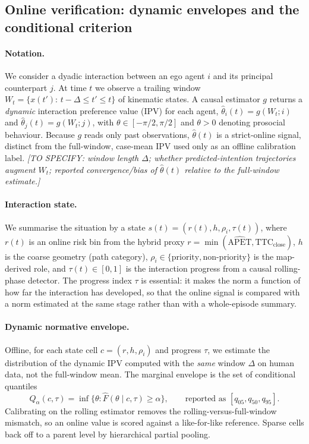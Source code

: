 \documentclass[12pt,a4paper]{article}
\begin{document}
\subsection{Online verification: dynamic envelopes and the conditional criterion}

\paragraph{Notation.}
We consider a dyadic interaction between an ego agent $i$ and its principal counterpart
$j$. At time $t$ we observe a trailing window $W_t=\{x(t'):\,t-\Delta\le t'\le t\}$ of
kinematic states. A causal estimator $g$ returns a \emph{dynamic} interaction preference
value (IPV) for each agent, $\hat\theta_i(t)=g(W_t;i)$ and $\hat\theta_j(t)=g(W_t;j)$, with
$\theta\in[-\pi/2,\pi/2]$ and $\theta>0$ denoting prosocial behaviour. Because $g$ reads only
past observations, $\hat\theta(t)$ is a strict-online signal, distinct from the full-window,
case-mean IPV used only as an offline calibration label.
\emph{[TO SPECIFY: window length $\Delta$; whether predicted-intention trajectories augment
$W_t$; reported convergence/bias of $\hat\theta(t)$ relative to the full-window estimate.]}

\paragraph{Interaction state.}
We summarise the situation by a state $s(t)=(r(t),h,\rho_i,\tau(t))$, where $r(t)$ is an
online risk bin from the hybrid proxy $r=\min(\widehat{\mathrm{APET}},\mathrm{TTC}_{\mathrm{close}})$,
$h$ is the coarse geometry (path category), $\rho_i\in\{\text{priority},\text{non-priority}\}$
is the map-derived role, and $\tau(t)\in[0,1]$ is the interaction progress from a causal
rolling-phase detector. The progress index $\tau$ is essential: it makes the norm a function
of how far the interaction has developed, so that the online signal is compared with a norm
estimated at the same stage rather than with a whole-episode summary.

\paragraph{Dynamic normative envelope.}
Offline, for each state cell $c=(r,h,\rho_i)$ and progress $\tau$, we estimate the
distribution of the dynamic IPV computed with the \emph{same} window $\Delta$ on human data,
not the full-window mean. The marginal envelope is the set of conditional quantiles
\begin{equation}
Q_\alpha(c,\tau)=\inf\{\theta:\hat F(\theta\mid c,\tau)\ge\alpha\},\qquad
\text{reported as } [q_{05},q_{50},q_{95}].
\end{equation}
Calibrating on the rolling estimator removes the rolling-versus-full-window mismatch, so an
online value is scored against a like-for-like reference. Sparse cells back off to a parent
level by hierarchical partial pooling.
\end{document}
